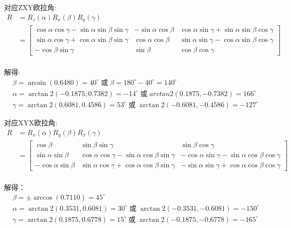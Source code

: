 \documentclass[UTF8, 13pt]{ctexart}
\begin{document}
对应ZXY欧拉角:
\[
\begin{aligned}
    R &= R_z(\alpha) R_x(\beta) R_y(\gamma) \\
        &= \begin{bmatrix}
                \cos\alpha \cos\gamma - \sin\alpha \sin\beta \sin\gamma & -\sin\alpha \cos\beta & \cos\alpha \sin\gamma + \sin\alpha \sin\beta \cos\gamma \\
                \sin\alpha \cos\gamma + \cos\alpha \sin\beta \sin\gamma & \cos\alpha \cos\beta & \sin\alpha \sin\gamma - \cos\alpha \sin\beta \cos\gamma \\
                -\cos\beta \sin\gamma & \sin\beta & \cos\beta \cos\gamma
            \end{bmatrix} \\
\end{aligned}
\]

解得:
\[
\begin{aligned}
    &\beta = \arcsin(0.6480) = 40^\circ \; \text{或} \; \beta = 180^\circ - 40^\circ = 140^\circ \\
    &\alpha = \arctan2(-0.1875, 0.7382) = -14^\circ \; \text{或} \; arctan2(0.1875, -0.7382) = 166^\circ \\
    &\gamma = \arctan2(0.6081, 0.4586) = 53^\circ \; \text{或} \; \arctan2(-0.6081, -0.4586) = -127^\circ
\end{aligned}
\]
\vspace{1em}

对应XYX欧拉角:
\[
\begin{aligned}
    R &= R_x(\alpha) R_y(\beta) R_x(\gamma) \\
        &=  \begin{bmatrix}
                \cos\beta & \sin\beta \sin\gamma & \sin\beta \cos\gamma \\
                \sin\alpha \sin\beta & \cos\alpha \cos\gamma - \sin\alpha \cos\beta \sin\gamma & -\cos\alpha \sin\gamma - \sin\alpha \cos\beta \cos\gamma \\
                -\cos\alpha \sin\beta & \sin\alpha \cos\gamma + \cos\alpha \cos\beta \sin\gamma & -\sin\alpha \sin\gamma + \cos\alpha \cos\beta \cos\gamma
            \end{bmatrix} \\
\end{aligned}
\]

解得：
\[
\begin{aligned}
    &\beta = \pm \arccos(0.7110) = 45^\circ \\
    &\alpha = \arctan2(0.3531, 0.6081) = 30^\circ \; \text{或} \; \arctan2(-0.3531, -0.6081) = -150^\circ \\
    &\gamma = \arctan2(0.1875, 0.6778) = 15^\circ \; \text{或} \; \arctan2(-0.1875, -0.6778) = -165^\circ
\end{aligned}
\]
\vspace{1em}
\end{document}
